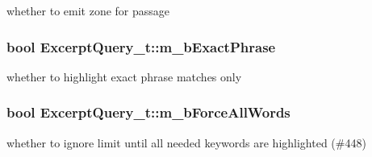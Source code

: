 whether to emit zone for passage 

\hypertarget{structExcerptQuery__t_a4d92e1b0d1a788f90c60d2def2f0e4e0}{
\subsubsection[{m\-\_\-b\-Exact\-Phrase}]{\setlength{\rightskip}{0pt plus 5cm}bool Excerpt\-Query\-\_\-t\-::m\-\_\-b\-Exact\-Phrase}}\label{structExcerptQuery__t_a4d92e1b0d1a788f90c60d2def2f0e4e0}


whether to highlight exact phrase matches only 

\hypertarget{structExcerptQuery__t_adb96d373f11459d1f49613dd7019f4ab}{
\subsubsection[{m\-\_\-b\-Force\-All\-Words}]{\setlength{\rightskip}{0pt plus 5cm}bool Excerpt\-Query\-\_\-t\-::m\-\_\-b\-Force\-All\-Words}}\label{structExcerptQuery__t_adb96d373f11459d1f49613dd7019f4ab}


whether to ignore limit until all needed keywords are highlighted (\#448) 

